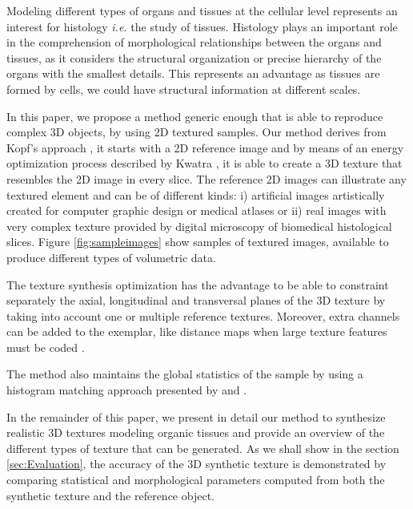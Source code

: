 Modeling different types of organs and tissues at the cellular level represents an interest for histology 
\emph{i.e.} the study of tissues. Histology plays an important role in the comprehension of 
morphological relationships between the organs and tissues, as it considers the structural organization 
or precise hierarchy of the organs with the smallest details. 
This represents an advantage as tissues are formed by cells, we could have structural information at different scales.

In this paper, we propose a method generic enough that is able to reproduce complex 3D objects, 
by using 2D textured samples.
Our method derives from Kopf's approach \cite{KFCODLW07}, it starts with a 2D reference image and 
by means of an energy optimization process described by Kwatra \cite{kwatra:2005:SIGGRAPH}, 
it is able to create a 3D texture that resembles the 2D image in every slice.
The reference 2D images can illustrate any textured element and can be of different kinds: i) artificial images artistically created for computer graphic design or medical atlases 
or ii) real images with very complex texture provided by digital microscopy of biomedical histological slices. 
Figure \ref{fig:sampleimages} show samples of textured images, available to produce different types of volumetric data.

The texture synthesis optimization has the advantage to be able to constraint separately the axial, longitudinal and transversal planes of the 3D texture 
by taking into account one or multiple reference textures. 
Moreover, extra channels can be added to the exemplar, like distance maps when large texture features must be coded  \cite{Lefebvre:2006:ATS:1141911.1141921}. 

The method also maintains the global statistics of the sample by using a histogram matching 
approach presented by \cite{ROLLAND2000} and \cite{Heeger:1995:PTA:218380.218446}.
 
%
In the remainder of this paper, we present in detail our method to synthesize realistic 3D textures modeling organic tissues and  
provide an overview of the different types of texture that can be generated. As we shall show in the section  \ref{sec:Evaluation}, 
the accuracy of the 3D synthetic texture is demonstrated by comparing statistical and morphological parameters computed from both the synthetic texture and the reference object. 
%

